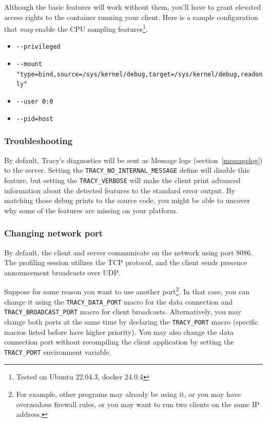 \documentclass[hidelinks,titlepage,a4paper,twoside]{article}
\begin{document}
Although the basic features will work without them, you'll have to grant elevated access rights to the container running your client. Here is a sample configuration that \textit{may} enable the CPU sampling features\footnote{Tested on Ubuntu 22.04.3, docker 24.0.4}.
\begin{itemize}
    \item \texttt{-{}-privileged}
    \item \texttt{-{}-mount "type=bind,source=/sys/kernel/debug,target=/sys/kernel/debug,readonly"}
    \item \texttt{-{}-user 0:0}
    \item \texttt{-{}-pid=host}
\end{itemize}

\subsubsection{Troubleshooting}

By default, Tracy's diagnostics will be sent as Message logs (section~\ref{messagelog}) to the server.
Setting the \texttt{TRACY\_NO\_INTERNAL\_MESSAGE} define will disable this feature, but setting the \texttt{TRACY\_VERBOSE} will make the client print advanced information about the detected features to the standard error output. By matching those debug prints to the source code, you might be able to uncover why some of the features are missing on your platform.

\subsubsection{Changing network port}

By default, the client and server communicate on the network using port 8086. The profiling session utilizes the TCP protocol, and the client sends presence announcement broadcasts over UDP.

Suppose for some reason you want to use another port\footnote{For example, other programs may already be using it, or you may have overzealous firewall rules, or you may want to run two clients on the same IP address.}. In that case, you can change it using the \texttt{TRACY\_DATA\_PORT} macro for the data connection and \texttt{TRACY\_BROADCAST\_PORT} macro for client broadcasts. Alternatively, you may change both ports at the same time by declaring the \texttt{TRACY\_PORT} macro (specific macros listed before have higher priority). You may also change the data connection port without recompiling the client application by setting the \texttt{TRACY\_PORT} environment variable.
\end{document}
